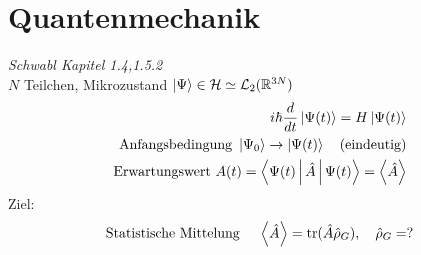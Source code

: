 \documentclass[11pt]{article}
\theoremstyle{plain}
\theoremstyle{mytheoremstyle}
\newcommand{\R}{\mathbb{R}}
\newcommand{\trace}{\operatorname{tr}}
\begin{document}
\section{Quantenmechanik}

\emph{Schwabl Kapitel 1.4,1.5.2}\\
$N $ Teilchen, Mikrozustand $\Ket{\Psi} \in \mathcal{H} \simeq \mathcal{L}_2(\R^{3N})$
\begin{align*}
  i \hbar \frac{d}{dt} \Ket{\Psi(t)} = H \Ket{\Psi(t)} \\
  \text{Anfangsbedingung } \Ket{\Psi_0} \to \Ket{\Psi(t)} \quad \text{(eindeutig)} \\
  \text{Erwartungswert } A(t)= \Braket{\Psi(t) | \hat{A} | \Psi(t)} =\Braket{\hat{A}}\\
\end{align*}
Ziel: \[ \text{Statistische Mittelung } \quad \Braket{\hat{A}} = \trace(\hat{A}\hat{\rho}_G), \quad \hat{\rho}_G=? \] 
\end{document}
